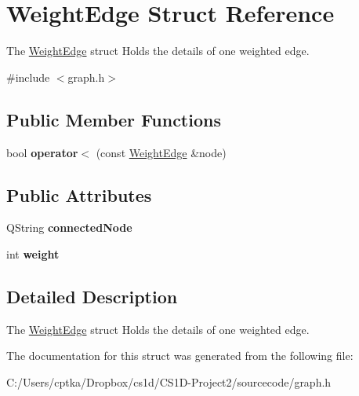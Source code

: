 \hypertarget{struct_weight_edge}{}\section{Weight\+Edge Struct Reference}
\label{struct_weight_edge}


The \mbox{\hyperlink{struct_weight_edge}{Weight\+Edge}} struct Holds the details of one weighted edge.  




{\ttfamily \#include $<$graph.\+h$>$}

\subsection*{Public Member Functions}
\begin{DoxyCompactItemize}
\item 
\mbox{\label{struct_weight_edge_a4663ebba7032dd5b445548520de68000}} 
bool {\bfseries operator$<$} (const \mbox{\hyperlink{struct_weight_edge}{Weight\+Edge}} \&node)
\end{DoxyCompactItemize}
\subsection*{Public Attributes}
\begin{DoxyCompactItemize}
\item 
\mbox{\label{struct_weight_edge_a8609e31a002e594d52033e2e8af657d9}} 
Q\+String {\bfseries connected\+Node}
\item 
\mbox{\label{struct_weight_edge_a6e727f6425ae66015c522cde2b9e27fb}} 
int {\bfseries weight}
\end{DoxyCompactItemize}


\subsection{Detailed Description}
The \mbox{\hyperlink{struct_weight_edge}{Weight\+Edge}} struct Holds the details of one weighted edge. 

The documentation for this struct was generated from the following file\+:\begin{DoxyCompactItemize}
\item 
C\+:/\+Users/cptka/\+Dropbox/cs1d/\+C\+S1\+D-\/\+Project2/sourcecode/graph.\+h\end{DoxyCompactItemize}
